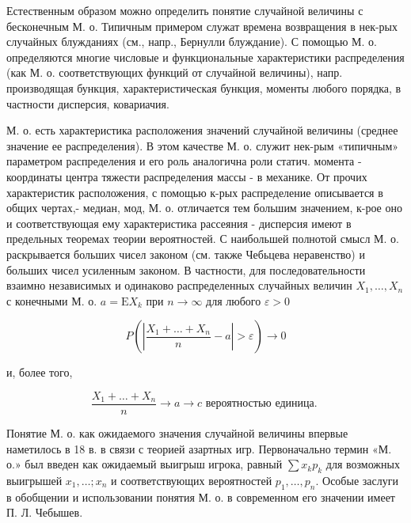 \documentclass[10pt]{article}
\begin{document}
Естественным образом можно определить понятие случайной величины с бесконечным М. о. Типичным примером служат времена возвращения в нек-рых случайных блужданиях (см., напр., Бернулли блуждание). С помощью М. о. определяются многие числовые и функциональные характеристики распределения (как М. о. соответствующих функций от случайной величины), напр. производящая бункция, характеристическая бункция, моменты любого порядка, в частности дисперсия, ковариачия.



М. о. есть характеристика расположения значений случайной величины (среднее значение ее распределения). В этом качестве М. о. служит нек-рым «типичным» параметром распределения и его роль аналогична роли статич. момента - координаты центра тяжести распределения массы - в механике. От прочих характеристик расположения, с помощью к-рых распределение описывается в общих чертах,- медиан, мод, М. о. отличается тем большим значением, к-рое оно и соответствующая ему характеристика рассеяния - дисперсия имеют в предельных теоремах теории вероятностей. С наибольшей полнотой смысл М. о. раскрывается больших чисел законом (см. также Чебьцева неравенство) и больших чисел усиленным законом. В частности, для последовательности взаимно независимых и одинаково распределенных случайных величин $X_{1}, \ldots, X_{n}$ с конечными М. о. $a=\mathrm{E} X_{k}$ при $n \rightarrow \infty$ для любого $\varepsilon>0$



\[

P\left(\left|\frac{X_{1}+\ldots+X_{n}}{n}-a\right|>\varepsilon\right) \longrightarrow 0

\]



и, более того,



\[

\frac{X_{1}+\ldots+X_{n}}{n} \longrightarrow a \longrightarrow c \text { вероятностью единица. }

\]



Понятие М. о. как ожидаемого значения случайной величины впервые наметилось в 18 в. в связи с теорией азартных игр. Первоначально термин «М. о.» был введен как ожидаемый выигрыш игрока, равный $\sum x_{k} p_{k}$ для возможных выигрышей $x_{1}, \ldots ; x_{n}$ и соответствующих вероятностей $p_{1}, \ldots, p_{n}$. Особые заслуги в обобщении и использовании понятия М. о. в современном его значении имеет П. Л. Чебышев.
\end{document}

